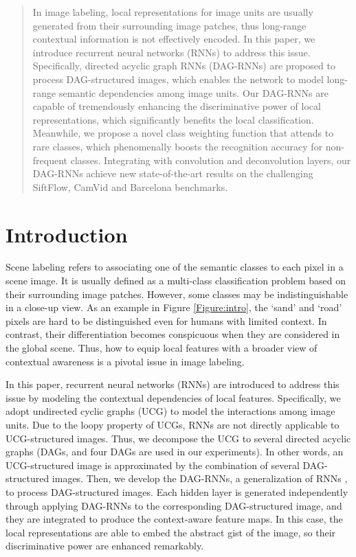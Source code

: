 \documentclass[10pt,twocolumn,letterpaper]{article}
\begin{document}
\begin{abstract}
  In image labeling, local representations for image units are usually generated from their surrounding image patches, thus long-range contextual information is not effectively encoded. In this paper, we introduce recurrent neural networks (RNNs) to address this issue.
  Specifically, directed acyclic graph RNNs (DAG-RNNs) are proposed to process DAG-structured images, which enables the network to model long-range semantic dependencies among image units.
  Our DAG-RNNs are capable of tremendously enhancing the discriminative power of local representations, which significantly benefits the local classification. Meanwhile, we propose a novel class weighting function that attends to rare classes, which phenomenally boosts the recognition accuracy for non-frequent classes. Integrating with convolution and deconvolution layers, our DAG-RNNs achieve new state-of-the-art results on the challenging SiftFlow, CamVid and Barcelona benchmarks.
\end{abstract}

\section{Introduction}

Scene labeling refers to associating one of the semantic classes to each pixel in a scene image. It is usually defined as a multi-class classification problem based on their surrounding image patches. However, some classes may be indistinguishable in a close-up view. As an example in Figure \ref{Figure:intro}, the `sand' and `road' pixels are hard to be distinguished even for humans with limited context. In contrast, their differentiation becomes conspicuous when they are considered in the global scene. Thus, how to equip local features with a broader view of contextual awareness is a pivotal issue in image labeling.



In this paper, recurrent neural networks (RNNs) \cite{graves2013speech}\cite{pascanu2012difficulty} are introduced to address this issue by modeling the contextual dependencies of local features. Specifically, we adopt undirected cyclic graphs (UCG) to model the interactions among image units.
Due to the loopy property of UCGs, RNNs are not directly applicable to UCG-structured images. Thus, we decompose the UCG to several directed acyclic graphs (DAGs, and four DAGs are used in our experiments).
In other words, an UCG-structured image is approximated by the combination of several DAG-structured images. Then, we develop the DAG-RNNs, a generalization of RNNs \cite{graves2012offline}\cite{graves2013speech}, to process DAG-structured images. Each hidden layer is generated independently through applying DAG-RNNs to the corresponding DAG-structured image, and they are integrated to produce the context-aware feature maps. In this case, the local representations are able to embed the abstract gist of the image, so their discriminative power are enhanced remarkably.
\end{document}
